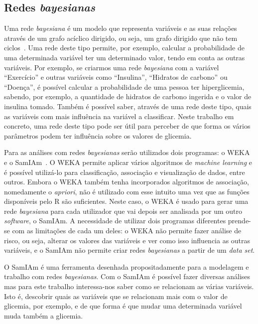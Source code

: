 \subsection{Redes \textit{bayesianas}}
Uma rede \textit{bayesiana} é um modelo que representa variáveis e as suas relações através de um grafo acíclico dirigido, ou seja, um grafo dirigido que não tem ciclos~\cite{bayes}. Uma rede deste tipo permite, por exemplo, calcular a probabilidade de uma determinada variável ter um determinado valor, tendo em conta as outras variáveis. Por exemplo, se criarmos uma rede \textit{bayesiana} com a variável ``Exercício'' e outras variáveis como ``Insulina'', ``Hidratos de carbono'' ou ``Doença'', é possível calcular a probabilidade de uma pessoa ter hiperglicemia, sabendo, por exemplo, a quantidade de hidratos de carbono ingerida e o valor de insulina tomado. Também é possível saber, através de uma rede deste tipo, quais as variáveis com mais influência na variável a classificar. Neste trabalho em concreto, uma rede deste tipo pode ser útil para perceber de que forma os vários parâmetros podem ter influência sobre os valores de glicemia.

Para as análises com redes \textit{bayesianas} serão utilizados dois programas: o \ac{WEKA}~\cite{weka} e o \ac{SamIAm}~\cite{samiam}.
O \ac{WEKA} permite aplicar vários algoritmos de \textit{machine learning} e é possível utilizá-lo para classificação, associação e visualização de dados, entre outros. Embora o \ac{WEKA} também tenha incorporados algoritmos de associação, nomedamente o \textit{apriori}, não é utilizado com esse intuito uma vez que as funções disponíveis pelo R são suficientes. Neste caso, o \ac{WEKA} é usado para gerar uma rede \textit{bayesiana} para cada utilizador que vai depois ser analisada por um outro \textit{software}, o \ac{SamIAm}. A necessidade de utilizar dois programas diferentes prende-se com as limitações de cada um deles: o \ac{WEKA} não permite fazer análise de risco, ou seja, alterar os valores das variáveis e ver como isso influencia as outras variáveis, e o \ac{SamIAm} não permite criar redes \textit{bayesianas} a partir de um \textit{data set}.

O \ac{SamIAm} é uma ferramenta desenhada propositadamente para a modelagem e trabalho com redes \textit{bayesianas}. Com o \ac{SamIAm} é possível fazer diversas análises mas para este trabalho interessa-nos saber como se relacionam as várias variáveis. Isto é, descobrir quais as variáveis que se relacionam mais com o valor de glicemia, por exemplo, e de que forma é que mudar uma determinada variável muda também a glicemia.

